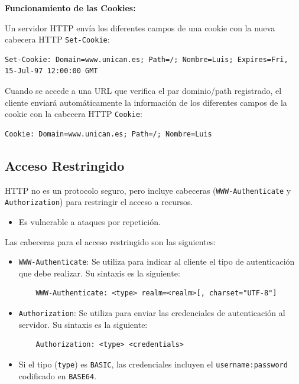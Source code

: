 \documentclass[a4paper,12pt]{article}
\begin{document}
\textbf{Funcionamiento de las Cookies:}

Un servidor HTTP envía los diferentes campos de una cookie con la nueva cabecera HTTP \texttt{Set-Cookie}:

\begin{verbatim}
Set-Cookie: Domain=www.unican.es; Path=/; Nombre=Luis; Expires=Fri, 15-Jul-97 12:00:00 GMT
\end{verbatim}

Cuando se accede a una URL que verifica el par dominio/path registrado, el cliente enviará automáticamente la información de los diferentes campos de la cookie con la cabecera HTTP \texttt{Cookie}:

\begin{verbatim}
Cookie: Domain=www.unican.es; Path=/; Nombre=Luis
\end{verbatim}

\subsection{Acceso Restringido}

HTTP no es un protocolo seguro, pero incluye cabeceras (\texttt{WWW-Authenticate} y \texttt{Authorization}) para restringir el acceso a recursos.

\begin{itemize}
    \item Es vulnerable a ataques por repetición.
\end{itemize}

Las cabeceras para el acceso restringido son las siguientes:

\begin{itemize}
    \item \texttt{WWW-Authenticate}: Se utiliza para indicar al cliente el tipo de autenticación que debe realizar. Su sintaxis es la siguiente:
    \begin{verbatim}
    WWW-Authenticate: <type> realm=<realm>[, charset="UTF-8"]
    \end{verbatim}
    \item \texttt{Authorization}: Se utiliza para enviar las credenciales de autenticación al servidor. Su sintaxis es la siguiente:
    \begin{verbatim}
    Authorization: <type> <credentials>
    \end{verbatim}
    \item Si el tipo (\texttt{type}) es \texttt{BASIC}, las credenciales incluyen el \texttt{username:password} codificado en \texttt{BASE64}.
\end{itemize}
\end{document}
